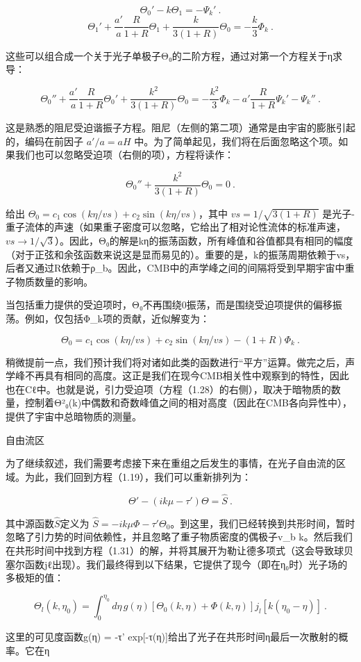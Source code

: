 \[ \Theta_0' - k \Theta_1 = -\Psi_k'~. \]
\[ \Theta_1' + \frac{a'}{a} \frac{R}{1 + R} \Theta_1 + \frac{k}{3(1 + R)} \Theta_0 = -\frac{k}{3} \Phi_k~. \]

这些可以组合成一个关于光子单极子Θ₀的二阶方程，通过对第一个方程关于η求导：

\[ \Theta_0'' + \frac{a'}{a} \frac{R}{1 + R} \Theta_0' + \frac{k^2}{3(1 + R)} \Theta_0 = -\frac{k^2}{3} \Phi_k - a' \frac{R}{1 + R} \Psi_k' - \Psi_k''~. \]

这是熟悉的阻尼受迫谐振子方程。阻尼（左侧的第二项）通常是由宇宙的膨胀引起的，编码在前因子 \( a'/a = aH \) 中。为了简单起见，我们将在后面忽略这个项。如果我们也可以忽略受迫项（右侧的项），方程将读作：

\[ \Theta_0'' + \frac{k^2}{3(1 + R)} \Theta_0 = 0~. \]

给出 \( \Theta_0 = c_1 \cos(k\eta/vs) + c_2 \sin(k\eta/vs) \)，其中 \( vs = 1/\sqrt{3(1 + R)} \) 是光子-重子流体的声速（如果重子密度可以忽略，它给出了相对论性流体的标准声速，\( vs \rightarrow 1/\sqrt{3} \)）。因此，Θ₀的解是kη的振荡函数，所有峰值和谷值都具有相同的幅度（对于正弦和余弦函数来说这是显而易见的）。重要的是，k的振荡周期依赖于vs，后者又通过R依赖于ρ_b。因此，CMB中的声学峰之间的间隔将受到早期宇宙中重子物质数量的影响。

当包括重力提供的受迫项时，Θ₀不再围绕0振荡，而是围绕受迫项提供的偏移振荡。例如，仅包括Φ_k项的贡献，近似解变为：

\[ \Theta_0 = c_1 \cos(k\eta/vs) + c_2 \sin(k\eta/vs) - (1 + R) \Phi_k~. \]

稍微提前一点，我们预计我们将对诸如此类的函数进行“平方”运算。做完之后，声学峰不再具有相同的高度。这正是我们在现今CMB相关性中观察到的特性，因此也在Cℓ中。也就是说，引力受迫项（方程（1.28）的右侧），取决于暗物质的数量，控制着Θ²₀(k)中偶数和奇数峰值之间的相对高度（因此在CMB各向异性中），提供了宇宙中总暗物质的测量。

自由流区

为了继续叙述，我们需要考虑接下来在重组之后发生的事情，在光子自由流的区域。为此，我们回到方程（1.19），我们可以重新排列为：

\[ \Theta' - (ik\mu - \tau') \Theta = \hat{S}~. \]

其中源函数\( \hat{S} \)定义为 \( \hat{S} = -ik\mu \Phi - \tau' \Theta_0 \)。到这里，我们已经转换到共形时间，暂时忽略了引力势的时间依赖性，并且忽略了重子物质密度的偶极子v_b k。然后我们在共形时间中找到方程（1.31）的解，并将其展开为勒让德多项式（这会导致球贝塞尔函数jℓ出现）。我们最终得到以下结果，它提供了现今（即在η₀时）光子场的多极矩的值：

\[ \Theta_l(k, \eta_0) = \int_0^{\eta_0} d\eta \, g(\eta) \left[ \Theta_0(k, \eta) + \Phi(k, \eta) \right] j_l[k(\eta_0 - \eta)]~.\]

这里的可见度函数g(η) = -τ' exp[-τ(η)]给出了光子在共形时间η最后一次散射的概率。它在η 

